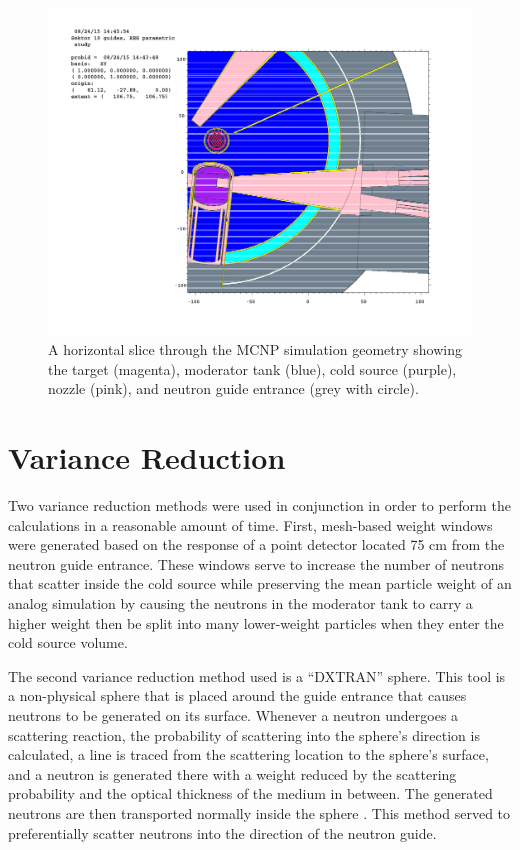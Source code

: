 \documentclass[a4paper]{jpconf}
\begin{document}
\begin{figure}
\begin{center}
\includegraphics[trim={9.2cm 8cm 4cm 8cm},clip]{graphics/geom.pdf}
\end{center}
\caption{\label{geom}A horizontal slice through the MCNP simulation geometry showing the target (magenta), moderator tank (blue), cold source (purple), nozzle (pink), and neutron guide entrance (grey with circle).}
\end{figure}

\section{Variance Reduction}

Two variance reduction methods were used in conjunction in order to perform the calculations in a reasonable amount of time.  First, mesh-based weight windows were generated based on the response of a point detector located 75 cm from the neutron guide entrance.  These windows serve to increase the number of neutrons that scatter inside the cold source while preserving the mean particle weight of an analog simulation by causing the neutrons in the moderator tank to carry a higher weight then be split into many lower-weight particles when they enter the cold source volume.  

The second variance reduction method used is a ``DXTRAN'' sphere.  This tool is a non-physical sphere that is placed around the guide entrance that causes neutrons to be generated on its surface.  Whenever a neutron undergoes a scattering reaction, the probability of scattering into the sphere's direction is calculated, a line is traced from the scattering location to the sphere's surface, and a neutron is generated there with a weight reduced by the scattering probability and the optical thickness of the medium in between.  The generated neutrons are then transported normally inside the sphere \cite{mcnp}.  This method served to preferentially scatter neutrons into the direction of the neutron guide.
\end{document}
